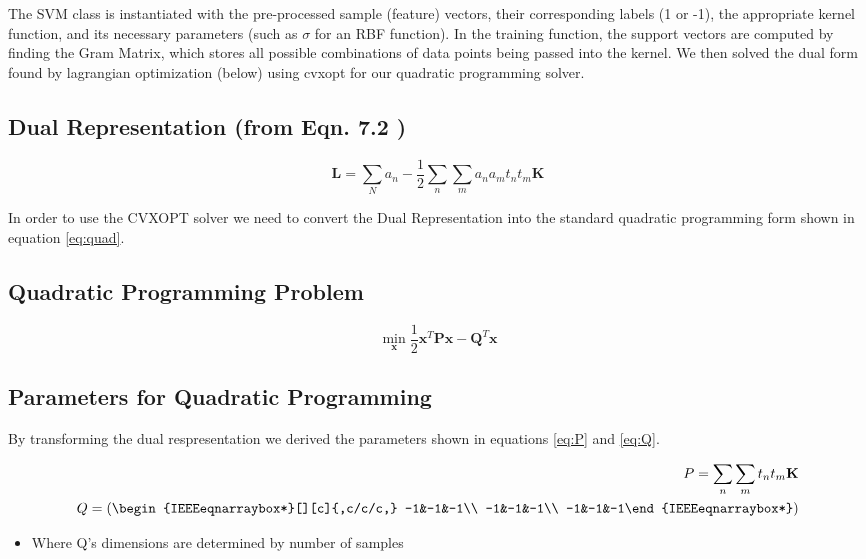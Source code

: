 \documentclass[journal]{IEEEtran}
\begin{document}
    The SVM class is instantiated with the pre-processed sample (feature) vectors, their corresponding labels (1 or -1), the appropriate kernel function, and its necessary parameters (such as $\sigma$ for an RBF function).  In the training function, the support vectors are computed by finding the Gram Matrix, which stores all possible combinations of data points being passed into the kernel. We then solved the dual form found by lagrangian optimization (below) using cvxopt for our quadratic programming solver.

    \subsection{Dual Representation (from Eqn. 7.2 \cite{BishopBook})}
    \begin{equation}
    \mathbf{L} = \sum\limits_{N} a_n - \frac{1}{2} \sum\limits_{n} \sum\limits_{m} a_n a_m t_n t_m \mathbf{K}
    \end{equation}

    In order to use the CVXOPT solver we need to convert the Dual Representation into the standard quadratic programming form shown in equation \ref{eq:quad}.

    \subsection{Quadratic Programming Problem \cite{QuadraticCVXOPT}}
    \begin{equation}
    \label{eq:quad}
    \min_{\mathbf{x}} \frac{1}{2}\mathbf{x}^T\mathbf{P}\mathbf{x} - \mathbf{Q}^T\mathbf{x}
    \end{equation}

    \subsection{Parameters for Quadratic Programming}

    By transforming the dual respresentation we derived the parameters shown in equations \ref{eq:P} and \ref{eq:Q}.

    \begin{eqnarray}
    \label{eq:P}
    P = \sum\limits_{n} \sum\limits_{m} t_n t_m \mathbf{K}\\
    \label{eq:Q}
    Q = \left(\begin{IEEEeqnarraybox*}[][c]{,c/c/c,}
    -1&-1&-1\\
    -1&-1&-1\\
    -1&-1&-1%
    \end{IEEEeqnarraybox*}\right)
    \end{eqnarray}
    \begin{itemize}
    \item Where Q's dimensions are determined by number of samples
    \end{itemize}
\end{document}
